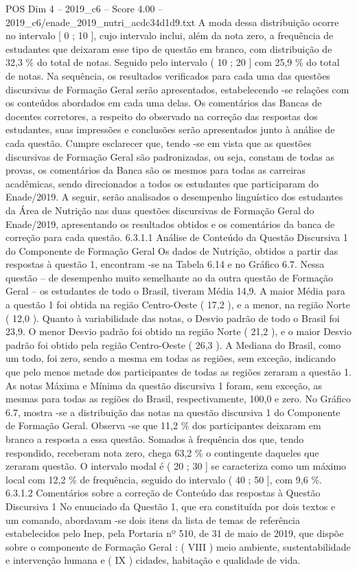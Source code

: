 \begin{textsample}{POS Dim 4 – 2019\_c6 – Score 4.00 – 2019\_c6/enade\_2019\_nutri\_acdc34d1d9.txt}
A moda dessa distribuição ocorre no intervalo [ 0 ; 10 ], cujo intervalo inclui, além da nota zero, a frequência de estudantes que deixaram esse tipo de questão em branco, com distribuição de 32,3 \% do total de notas.
Seguido pelo intervalo ( 10 ; 20 ] com 25,9 \% do total de notas.
Na sequência, os resultados verificados para cada uma das questões discursivas de Formação Geral serão apresentados, estabelecendo -se relações com os conteúdos abordados em cada uma delas.
Os comentários das Bancas de docentes corretores, a respeito do observado na correção das respostas dos estudantes, suas impressões e conclusões serão apresentados junto à análise de cada questão.
Cumpre esclarecer que, tendo -se em vista que as questões discursivas de Formação Geral são padronizadas, ou seja, constam de todas as provas, os comentários da Banca são os mesmos para todas as carreiras acadêmicas, sendo direcionados a todos os estudantes que participaram do Enade/2019.
A seguir, serão analisados o desempenho linguístico dos estudantes da Área de Nutrição nas duas questões discursivas de Formação Geral do Enade/2019, apresentando os resultados obtidos e os comentários da banca de correção para cada questão. 6.3.1.1 Análise de Conteúdo da Questão Discursiva 1 do Componente de Formação Geral Os dados de Nutrição, obtidos a partir das respostas à questão 1, encontram -se na Tabela 6.14 e no Gráfico 6.7.
Nessa questão – de desempenho muito semelhante ao da outra questão de Formação Geral – os estudantes de todo o Brasil, tiveram Média 14,9.
A maior Média para a questão 1 foi obtida na região Centro-Oeste ( 17,2 ), e a menor, na região Norte ( 12,0 ).
Quanto à variabilidade das notas, o Desvio padrão de todo o Brasil foi 23,9.
O menor Desvio padrão foi obtido na região Norte ( 21,2 ), e o maior Desvio padrão foi obtido pela região Centro-Oeste ( 26,3 ).
A Mediana do Brasil, como um todo, foi zero, sendo a mesma em todas as regiões, sem exceção, indicando que pelo menos metade dos participantes de todas as regiões zeraram a questão 1.
As notas Máxima e Mínima da questão discursiva 1 foram, sem exceção, as mesmas para todas as regiões do Brasil, respectivamente, 100,0 e zero.
No Gráfico 6.7, mostra -se a distribuição das notas na questão discursiva 1 do Componente de Formação Geral.
Observa -se que 11,2 \% dos participantes deixaram em branco a resposta a essa questão.
Somados à frequência dos que, tendo respondido, receberam nota zero, chega 63,2 \% o contingente daqueles que zeraram questão.
O intervalo modal é ( 20 ; 30 ] se caracteriza como um máximo local com 12,2 \% de frequência, seguido do intervalo ( 40 ; 50 ], com 9,6 \%. 6.3.1.2 Comentários sobre a correção de Conteúdo das respostas à Questão Discursiva 1 No enunciado da Questão 1, que era constituída por dois textos e um comando, abordavam -se dois itens da lista de temas de referência estabelecidos pelo Inep, pela Portaria nº 510, de 31 de maio de 2019, que dispõe sobre o componente de Formação Geral : ( VIII ) meio ambiente, sustentabilidade e intervenção humana e ( IX ) cidades, habitação e qualidade de vida.

\end{textsample}
